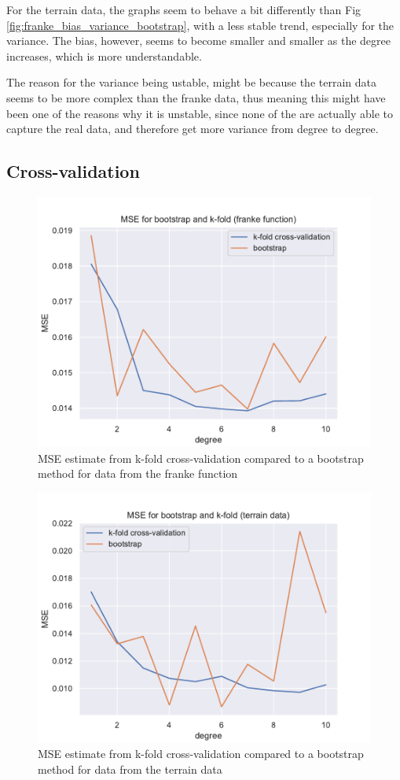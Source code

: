 \documentclass[12pt]{article}
\begin{document}
For the terrain data, the graphs seem to behave a bit differently than Fig \ref{fig:franke_bias_variance_bootstrap}, with a less stable trend, especially for the variance.
The bias, however, seems to become smaller and smaller as the degree increases, which is more understandable.

The reason for the variance being ustable, might be because the terrain data seems to be more complex than the franke data, thus meaning this might have been one of the reasons why it is unstable, since none of the are actually able to capture the real data, and therefore get more variance from degree to degree.


\subsection{Cross-validation}


\begin{figure}[H]
    \centering
    \includegraphics[width=0.7\columnwidth]{../src/output/bootstrap_cross_validation_franke_function.pdf}
    \caption{MSE estimate from k-fold cross-validation compared to a bootstrap method for data from the franke function}
    \label{fig:bootstrap_cross_validation_franke}
\end{figure}

\begin{figure}[H]
    \centering
    \includegraphics[width=0.7\columnwidth]{../src/output/bootstrap_cross_validation_terrain_data.pdf}
    \caption{MSE estimate from k-fold cross-validation compared to a bootstrap method for data from the terrain data}
    \label{fig:bootstrap_cross_validation_terrain}
\end{figure}
\end{document}
